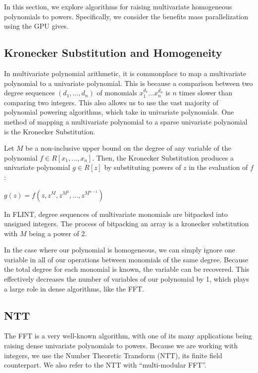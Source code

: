 In this section, we explore algorithms for raising multivariate homogeneous polynomials to powers. Specifically, we consider the benefits mass parallelization using the GPU gives.

\subsection{Kronecker Substitution and Homogeneity}
In multivariate polynomial arithmetic, it is commonplace to map a multivariate polynomial to a univariate 
polynomial. This is because a comparison between two degree sequences $(d_1, \dots , d_n)$ of monomials 
$x_1^{d_1} \dots x_n^{d_n}$ is $n$ times slower than comparing two integers. This also allows us to use the vast majority of polynomial powering algorithms, which take in univariate polynomials. One method of mapping a multivariate polynomial to a sparse univariate polynomial is the Kronecker Substitution.

\begin{defn}
    Let $M$ be a non-inclusive upper bound on the degree of any variable of the polynomial
    $f \in R[x_1, \dots, x_n]$. Then, the Kronecker Substitution \cite{arnold-2014-kronecker} produces a univariate polynomial $g \in R[z]$ by substituting powers of $z$ in 
    the evaluation of $f$: 

    \begin{center}
        $g(z) = f(z, z^M, z^{M^2}, \dots, z^{M^{n-1}})$
    \end{center}
\end{defn}

\begin{rmk}
    In FLINT, degree sequences of multivariate monomials are bitpacked into unsigned integers. The process of bitpacking an array is a kronecker substitution with $M$ being a power of 2.
\end{rmk}

In the case where our polynomial is homogeneous, we can simply ignore one variable in all of our operations between monomials of the same degree. Because the total degree for each monomial is known, the variable can be recovered. This effectively decreases the number of variables of our polynomial by 1, which plays a large role in dense algorithms, like the FFT.

\subsection{NTT}
The FFT is a very well-known algorithm, with one of its many applications being raising dense univariate polynomials to powers.
Because we are working with integers, we use the Number Theoretic Transform (NTT), its finite field counterpart. We also refer to the NTT with ``multi-modular FFT''.

